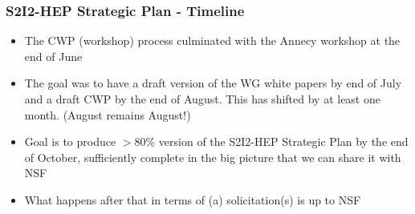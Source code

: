 \begin{frame}
\frametitle{S2I2-HEP Strategic Plan - Timeline}

\begin{itemize}
\item The CWP (workshop) process culminated with the Annecy workshop at the end of June
\item The goal was to have a draft version of the WG white papers by end of July and a draft CWP by the end of August. This has shifted by at least one month. (August remains August!)
\item Goal is to produce $>$80\% version of the S2I2-HEP Strategic Plan by the end of October, sufficiently complete in the big picture that we can share it with NSF
\item What happens after that in terms of (a) solicitation(s) is up to NSF
\end{itemize}

\end{frame}


